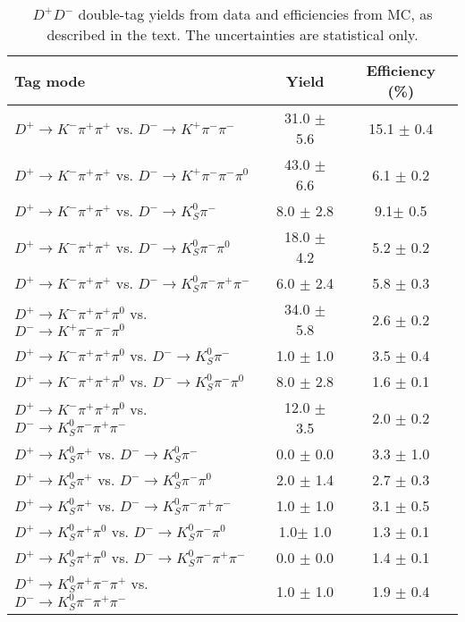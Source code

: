 \documentclass[aps,preprint,tightenlines,superscriptaddress,showpacs,byrevtex,amsmath,amssymb,nofloatfix]{revtex4}
\begin{document}
\begin{appendix}
\begin{table}[!htbp]
\caption{\small $D^{+}D^{-}$  double-tag yields from data and efficiencies from MC, as described in the text. The uncertainties are statistical only.}
\label{sys_err_gamX}
\begin{tabular}{l| c |c }
\hline
     Tag mode     & Yield &  Efficiency (\%)   \\
    \hline
    $D^{+} \rightarrow K^{-}\pi^{+}\pi^{+}$ vs. $D^{-} \rightarrow K^{+}\pi^{-}\pi^{-}$   &31.0 $\pm$  5.6&15.1 $\pm$ 0.4\\
    $D^{+} \rightarrow K^{-}\pi^{+}\pi^{+}$ vs. $D^{-} \rightarrow K^{+}\pi^{-}\pi^{-}\pi^{0}$ &43.0  $\pm$ 6.6& 6.1 $\pm$ 0.2\\
    $D^{+} \rightarrow K^{-}\pi^{+}\pi^{+}$ vs. $D^{-} \rightarrow K^{0}_{S}\pi^{-}$   &8.0  $\pm$ 2.8&9.1$\pm$  0.5\\
    $D^{+} \rightarrow K^{-}\pi^{+}\pi^{+}$ vs. $D^{-} \rightarrow K^{0}_{S}\pi^{-}\pi^{0}$ &18.0 $\pm$  4.2&5.2 $\pm$ 0.2  \\
    $D^{+} \rightarrow K^{-}\pi^{+}\pi^{+}$ vs. $D^{-} \rightarrow K^{0}_{S}\pi^{-}\pi^{+}\pi^{-}$ &6.0 $\pm$  2.4& 5.8 $\pm$ 0.3    \\
    $D^{+} \rightarrow K^{-}\pi^{+}\pi^{+}\pi^{0}$ vs. $D^{-} \rightarrow K^{+}\pi^{-}\pi^{-}\pi^{0}$ &34.0  $\pm$ 5.8& 2.6 $\pm$ 0.2  \\
    $D^{+} \rightarrow K^{-}\pi^{+}\pi^{+}\pi^{0}$ vs.  $D^{-} \rightarrow K^{0}_{S}\pi^{-}$  &1.0 $\pm$  1.0& 3.5 $\pm$ 0.4\\
    $D^{+} \rightarrow K^{-}\pi^{+}\pi^{+}\pi^{0}$ vs.  $D^{-} \rightarrow K^{0}_{S}\pi^{-}\pi^{0}$ &8.0 $\pm$  2.8& 1.6 $\pm$ 0.1\\
    $D^{+} \rightarrow K^{-}\pi^{+}\pi^{+}\pi^{0}$ vs. $D^{-} \rightarrow K^{0}_{S}\pi^{-}\pi^{+}\pi^{-}$  &12.0 $\pm$  3.5& 2.0 $\pm$ 0.2\\
    $D^{+} \rightarrow K^{0}_{S}\pi^{+}$  vs. $D^{-} \rightarrow K^{0}_{S}\pi^{-}$   &0.0 $\pm$  0.0&  3.3 $\pm$ 1.0\\
    $D^{+} \rightarrow K^{0}_{S}\pi^{+}$  vs.  $D^{-} \rightarrow K^{0}_{S}\pi^{-}\pi^{0}$ &2.0  $\pm$ 1.4& 2.7 $\pm$ 0.3 \\
    $D^{+} \rightarrow K^{0}_{S}\pi^{+}$  vs.   $D^{-} \rightarrow K^{0}_{S}\pi^{-}\pi^{+}\pi^{-}$   &1.0  $\pm$ 1.0& 3.1 $\pm$ 0.5  \\
    $D^{+} \rightarrow K^{0}_{S}\pi^{+}\pi^{0}$  vs.   $D^{-} \rightarrow K^{0}_{S}\pi^{-}\pi^{0}$    &1.0$\pm$   1.0& 1.3 $\pm$ 0.1 \\
    $D^{+} \rightarrow K^{0}_{S}\pi^{+}\pi^{0}$  vs.  $D^{-} \rightarrow K^{0}_{S}\pi^{-}\pi^{+}\pi^{-}$  &0.0 $\pm$ 0.0& 1.4 $\pm$ 0.1 \\
    $D^{+} \rightarrow K^{0}_{S}\pi^{+}\pi^{-}\pi^{+}$ vs. $D^{-} \rightarrow K^{0}_{S}\pi^{-}\pi^{+}\pi^{-}$  &1.0  $\pm$ 1.0& 1.9 $\pm$ 0.4\\
    \hline
\end{tabular}
\end{table}

\end{appendix}
\end{document}
